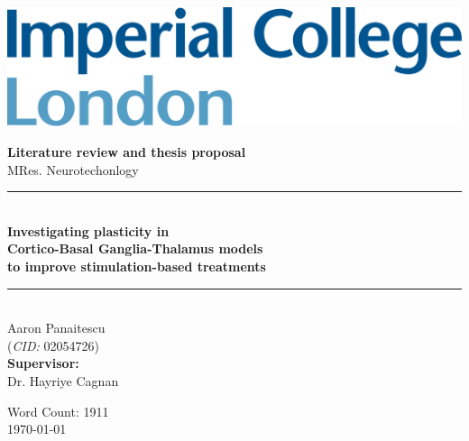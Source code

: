 \begin{titlepage}
	\newcommand{\HRule}{\rule{\linewidth}{0.5mm}}
	\setlength{\topmargin}{0in}
	\center

	\begin{flushleft} \large
		\begin{minipage}{0.4\textwidth}
			\includegraphics[scale=0.14]{imperial.png}
		\end{minipage}
	\end{flushleft}
	\vspace{4cm}

	\textbf{\large Literature review and thesis proposal}\\[0.1cm]
	{\large MRes. Neurotechonlogy}\\[0.5cm]

	\HRule \\[0.4cm]
	{\Large \bfseries Investigating plasticity in \\ Cortico-Basal Ganglia-Thalamus models \\ to improve stimulation-based treatments }
	\HRule \\[1cm]


	{\large Aaron Panaitescu \\
	(\textit{CID:} 02054726) \\[0.4cm]
	\textbf{Supervisor:} \\
	Dr. Hayriye Cagnan}


	\vfill
	{Word Count: 1911}\\[0.4cm]
	{\large \today}\\[0.8cm]
\end{titlepage}
\tableofcontents
\vfill
\printacronymsinline


